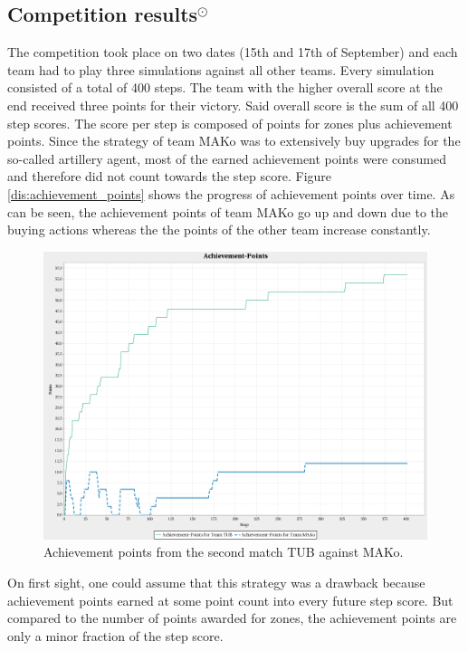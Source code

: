 \subsection{Competition results$^\odot$}
The competition took place on two dates (15th and 17th of September) and each team had to play three simulations against all other teams.
Every simulation consisted of a total of 400 steps.
The team with the higher overall score at the end received three points for their victory.
Said overall score is the sum of all 400 step scores.
The score per step is composed of points for zones plus achievement points.
Since the strategy of team MAKo was to extensively buy upgrades for the so-called artillery agent, most of the earned achievement points were consumed and therefore did not count towards the step score.
Figure \autoref{dis:achievement_points} shows the progress of achievement points over time.
As can be seen, the achievement points of team MAKo go up and down due to the buying actions whereas the the points of the other team increase constantly.
\begin{figure}[ht]
	\centering
	\includegraphics[width=\textwidth]{images/AchievementPoints.png}
	\caption{Achievement points from the second match TUB against MAKo.} %
	\label{dis:achievement_points}
\end{figure}
On first sight, one could assume that this strategy was a drawback because achievement points earned at some point count into every future step score.
But compared to the number of points awarded for zones, the achievement points are only a minor fraction of the step score.
